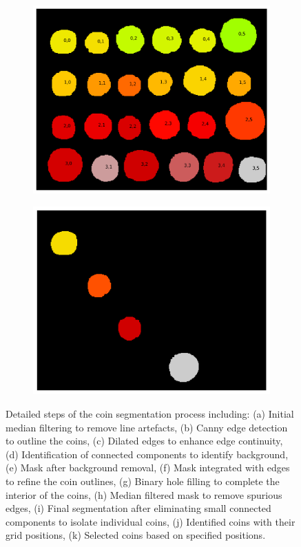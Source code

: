 \documentclass[11pt]{article}
\begin{document}
\begin{figure}[H]
    \begin{subfigure}{.45\textwidth}
        \centering
        \includegraphics[width=\linewidth]{figs/q1c_identified_coins.png}
        \caption{}
    \end{subfigure}%
    \begin{subfigure}{.45\textwidth}
        \centering
        \includegraphics[width=\linewidth]{figs/q1c_selected_coins.png}
        \caption{}
    \end{subfigure}%
    
    \caption{Detailed steps of the coin segmentation process including: (a) Initial median filtering to remove line artefacts, (b) Canny edge detection to outline the coins, (c) Dilated edges to enhance edge continuity, (d) Identification of connected components to identify background, (e) Mask after background removal, (f) Mask integrated with edges to refine the coin outlines, (g) Binary hole filling to complete the interior of the coins, (h) Median filtered mask to remove spurious edges, (i) Final segmentation after eliminating small connected components to isolate individual coins, (j) Identified coins with their grid positions, (k) Selected coins based on specified positions.}
    \label{fig:coin_segmentation_steps}
\end{figure}
\end{document}

